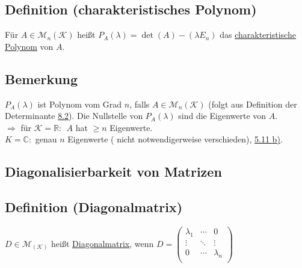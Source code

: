 \documentclass[a4paper, 12pt,titlepage, pdf, headsepline]{scrartcl}
\newcommand{\R}{\mathds{R}}
\newcommand{\K}{\mathcal{K}}
\newcommand{\M}{\mathcal{M}}
\newcommand{\C}{\mathds{C}}
\newcommand{\uline}[1]{\underline{#1}}
\renewcommand{\>}{\rightarrow}
\renewcommand{\*}{\cdot}
\begin{document}
\subsection{Definition (charakteristisches Polynom)}
Für $A \in \M_n(\K)$ heißt $P_A(\lambda) = \det(A)-(\lambda E_n)$ das \uline{charakteristische Polynom} von $A$.
\subsection{Bemerkung}
$P_A(\lambda)$ ist Polynom vom Grad $n$, falls $A \in \M_n(\K)$ (folgt aus Definition der Determinante \hyperref[8.2]{8.2}). Die Nullstelle von $P_A(\lambda)$ sind die Eigenwerte von $A$.\\
$\Rightarrow $ für $\K = \R:~~A $ hat $ \geq n$ Eigenwerte.\\
$K = \C: $ genau $n$ Eigenwerte ( nicht notwendigerweise verschieden), \hyperref[5.11]{5.11 b)}.
\subsection*{Diagonalisierbarkeit von Matrizen}
\subsection{Definition (Diagonalmatrix)}
$D \in \M_(\K)$ heißt \uline{Diagonalmatrix}, wenn $D = \begin{pmatrix}
\lambda_1 & \cdots & 0 \\
\vdots & \ddots & \vdots \\
0 & \cdots & \lambda_n \\
\end{pmatrix}$
\end{document}
